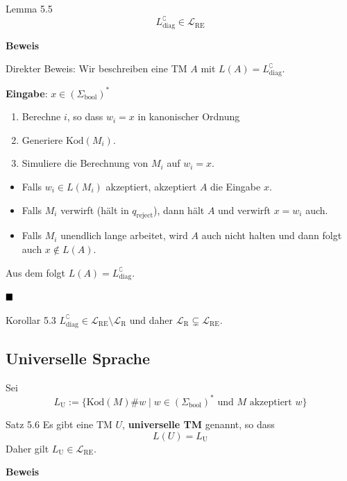 \documentclass[a4paper, 11pt]{article}
\def\Lre{\mathcal{L}_\text{RE}}
\def\Lr{\mathcal{L}_\text{R}}
\begin{document}
            
            
              

                \begin{mainbox}{Lemma 5.5}
                    $$L_{\text{diag}}^{\complement} \in \Lre$$
                \end{mainbox}
                \textbf{Beweis}
                    
                
                    Direkter Beweis: Wir beschreiben eine TM $A$ mit $L(A) = L_{\text{diag}}^\complement$.
                    
                    \textbf{Eingabe}: $x \in (\Sigma_{\text{bool}})^*$
                    
                    \begin{enumerate}[label=(\roman*)]
                        \item Berechne $i$, so dass $w_i = x$ in kanonischer Ordnung
                        \item Generiere $\text{Kod}(M_i)$.
                        \item Simuliere die Berechnung von $M_i$ auf $w_i = x$. 
                    \end{enumerate}
                   
                
                    \begin{itemize}[label=-]
                        \item Falls $w_i \in L(M_i)$ akzeptiert, akzeptiert $A$ die Eingabe $x$.
                        \item Falls $M_i$ verwirft (hält in $q_{\text{reject}}$), dann hält $A$ und verwirft $x = w_i$ auch.
                        \item Falls $M_i$ unendlich lange arbeitet, wird $A$ auch nicht halten und dann folgt auch $x \notin L(A)$.  
                    \end{itemize}
                    Aus dem folgt $L(A) = L_{\text{diag}}^\complement$.
                
                    $\hfill\blacksquare$
                    \begin{subbox}{Korollar 5.3}
                        $L_{\text{diag}}^\complement \in \Lre \setminus \Lr$ und daher $\Lr \subsetneq \Lre$.
                    \end{subbox}
                
                
                
                    \subsection{Universelle Sprache}
                    Sei 
                    $$L_{\text{U}} := \{\text{Kod}(M)\#w \mid w \in (\Sigma_{\text{bool}})^* \text{ und } M \text{ akzeptiert }w\}$$
                    \begin{mainbox}{Satz 5.6}
                        Es gibt eine TM $U$, \textbf{universelle TM} genannt, so dass 
                        $$L(U) = L_{\text{U}}$$
                        Daher gilt $L_{\text{U}} \in \Lre$.
                    \end{mainbox} 
                    \textbf{Beweis}
                
\end{document}

